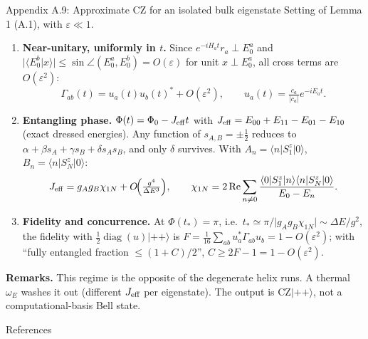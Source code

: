 \documentclass[aspectratio=169,11pt]{beamer}
\newcommand{\ket}[1]{\lvert #1\rangle}
\newcommand{\bra}[1]{\langle #1\rvert}
\newcommand{\diag}{\operatorname{diag}}
\begin{document}
\begin{frame}{Appendix A.9: Approximate CZ for an isolated bulk eigenstate}
\footnotesize
Setting of Lemma 1 (A.1), with $\varepsilon\ll1$.
\begin{enumerate}\setlength\itemsep{4pt}
\item \textbf{Near-unitary, uniformly in $t$.} Since $e^{-iH_at}r_a\perp E_0^a$ and $\lvert\langle E_0^b\vert x\rangle\rvert\le\sin\angle(E_0^a,E_0^b)=O(\varepsilon)$ for unit $x\perp E_0^a$, all cross terms are $O(\varepsilon^2)$:
\[
\Gamma_{ab}(t)=u_a(t)u_b(t)^*+O(\varepsilon^2),\qquad u_a(t)=\tfrac{c_a}{\lvert c_a\rvert}e^{-iE_at}.
\]
\item \textbf{Entangling phase.} $\Phi(t)=\Phi_0-J_{\rm eff}t$ with $J_{\rm eff}=E_{00}+E_{11}-E_{01}-E_{10}$ (exact dressed energies). Any function of $s_{A,B}=\pm\tfrac12$ reduces to $\alpha+\beta s_A+\gamma s_B+\delta s_As_B$, and only $\delta$ survives. With $A_n=\bra nS^z_1\ket0$, $B_n=\bra nS^z_N\ket0$:
\[
J_{\rm eff}=g_Ag_B\chi_{1N}+O\!\Bigl(\tfrac{g^4}{\Delta E^3}\Bigr),\qquad
\chi_{1N}=2\operatorname{Re}\sum_{n\neq0}\frac{\bra0S^z_1\ket n\bra nS^z_N\ket0}{E_0-E_n}.
\]
\item \textbf{Fidelity and concurrence.} At $\Phi(t_*)=\pi$, i.e.\ $t_*\simeq\pi/\lvert g_Ag_B\chi_{1N}\rvert\sim\Delta E/g^2$, the fidelity with $\tfrac12\diag(u)\ket{++}$ is $F=\frac1{16}\sum_{ab}u_a^*\Gamma_{ab}u_b=1-O(\varepsilon^2)$; with ``fully entangled fraction $\le(1+C)/2$'', $C\ge2F-1=1-O(\varepsilon^2)$.
\end{enumerate}
\medskip
\textbf{Remarks.} This regime is the opposite of the degenerate helix runs. A thermal $\omega_E$ washes it out (different $J_{\rm eff}$ per eigenstate). The output is $\mathrm{CZ}\ket{++}$, not a computational-basis Bell state.
\end{frame}

\begin{frame}{References}
\footnotesize
\nocite{Hall2014,Wootters1998,Parisio2024}


\end{frame}
\end{document}
